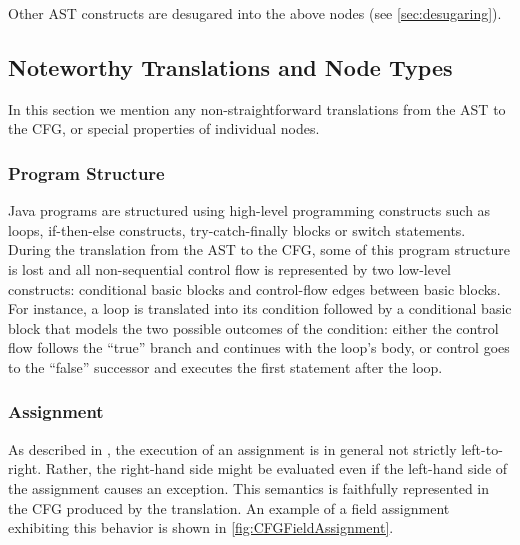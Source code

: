 Other AST constructs are desugared into the above nodes (see \autoref{sec:desugaring}).



\subsection{Noteworthy Translations and Node Types}
\label{sec:noteworthy-translations}

In this section we mention any non-straightforward translations from the AST to
the CFG, or special properties of individual nodes.


\subsubsection{Program Structure}
\label{sec:prog-structure}

Java programs are structured using high-level programming constructs
such as loops, if-then-else constructs,
try-catch-finally blocks or switch statements.  During the translation
from the AST to the CFG, some of this program structure is lost and all
non-sequential control flow is represented by two low-level
constructs: conditional basic blocks and control-flow edges between
basic blocks. For instance, a  loop is translated into its
condition followed by a conditional basic block that models the two
possible outcomes of the condition: either the control flow follows
the ``true'' branch and continues with the loop's body, or control goes to the
``false'' successor and executes the first statement after the loop.


\subsubsection{Assignment}

As described in , the execution of an assignment is in
general not strictly left-to-right. Rather, the right-hand side might
be evaluated even if the left-hand side of the assignment causes an
exception. This semantics is faithfully represented in the CFG
produced by the translation.  An example of a field assignment
exhibiting this behavior is shown in \autoref{fig:CFGFieldAssignment}.


